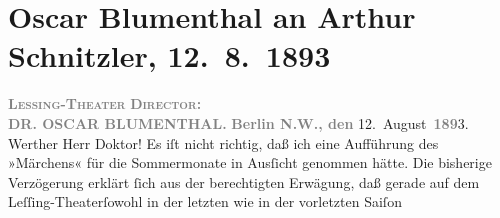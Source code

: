 

         
         \newcommand{\erwaehntePersonen}{Personen: }
         \newcommand{\erwaehnteInstitutionen}{Institutionen: Lessing-Theater}
         \newcommand{\erwaehnteOrte}{Orte: Berlin, Wien}
         \newcommand{\erwaehnteWerke}{Werke: Das Märchen. Schauspiel in drei Aufzügen}
               \section[Oscar Blumenthal an Arthur Schnitzler, 12. 8. 1893]{ Oscar Blumenthal an Arthur Schnitzler, 12. 8. 1893}\nopagebreak{}\rehead{ }\begin{ledgroupsized}[t]{13cm}\normalsize\beginnumbering \toendnotes[C]{\smallbreak\pagebreak[2]} 
\toendnotes[C]{\smallbreak}\pstart
           \noindent{}\centering{}{\pb}\textcolor{gray}{\textbf{\textsc{Lessing-Theater}}}\pend
           \pstart
           \noindent{}\centering{}\textcolor{gray}{\textbf{\textsc{Director}:}}{\\}\textcolor{gray}{\textbf{DR. OSCAR BLUMENTHAL.}}\pend
           \pstart
           \noindent{}\raggedleft{}\textcolor{gray}{\textbf{Berlin N.W., den}}{ }12. August \textcolor{gray}{\textbf{189}}3.\pend
           \pstart\center{}Werther Herr Doktor!\pend\pstart
           Es iſt nicht richtig, daß ich eine Aufführung des »Märchens« für die Sommermonate in Ausſicht genommen hätte. Die
               bisherige Verzögerung erklärt ſich aus der berechtigten Erwägung, daß gerade auf dem
                  Leſſing-Theaterſowohl in der letzten wie in der vorletzten Saiſon

\end{ledgroupsized}
